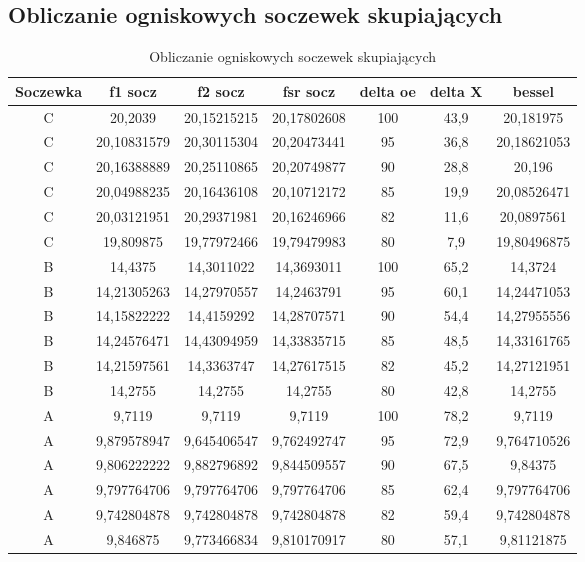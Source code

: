 \documentclass[polish,a4paper]{article}
\begin{document}
\subsection{Obliczanie ogniskowych soczewek skupiających}
\begin{table}[H]
\centering
\begin{tabular}{|c|c|c|c|c|c|c|}
\hline
Soczewka &  f1 socz &  f2 socz &  fsr socz &  delta oe &  delta X &  bessel \\
\hline
C &  20,2039 &  20,15215215 &  20,17802608 &  100 &  43,9 &  20,181975 \\
C &  20,10831579 &  20,30115304 &  20,20473441 &  95 &  36,8 &  20,18621053 \\
C &  20,16388889 &  20,25110865 &  20,20749877 &  90 &  28,8 &  20,196 \\
C &  20,04988235 &  20,16436108 &  20,10712172 &  85 &  19,9 &  20,08526471 \\
C &  20,03121951 &  20,29371981 &  20,16246966 &  82 &  11,6 &  20,0897561 \\
C &  19,809875 &  19,77972466 &  19,79479983 &  80 &  7,9 &  19,80496875 \\
\hline
B &  14,4375 &  14,3011022 &  14,3693011 &  100 &  65,2 &  14,3724 \\
B &  14,21305263 &  14,27970557 &  14,2463791 &  95 &  60,1 &  14,24471053 \\
B &  14,15822222 &  14,4159292 &  14,28707571 &  90 &  54,4 &  14,27955556 \\
B &  14,24576471 &  14,43094959 &  14,33835715 &  85 &  48,5 &  14,33161765 \\
B &  14,21597561 &  14,3363747 &  14,27617515 &  82 &  45,2 &  14,27121951 \\
B &  14,2755 &  14,2755 &  14,2755 &  80 &  42,8 &  14,2755 \\
\hline
A &  9,7119 &  9,7119 &  9,7119 &  100 &  78,2 &  9,7119 \\
A &  9,879578947 &  9,645406547 &  9,762492747 &  95 &  72,9 &  9,764710526 \\
A &  9,806222222 &  9,882796892 &  9,844509557 &  90 &  67,5 &  9,84375 \\
A &  9,797764706 &  9,797764706 &  9,797764706 &  85 &  62,4 &  9,797764706 \\
A &  9,742804878 &  9,742804878 &  9,742804878 &  82 &  59,4 &  9,742804878 \\
A &  9,846875 &  9,773466834 &  9,810170917 &  80 &  57,1 &  9,81121875 \\
\hline
\end{tabular}
\caption{Obliczanie ogniskowych soczewek skupiających}
\end{table}
\end{document}
